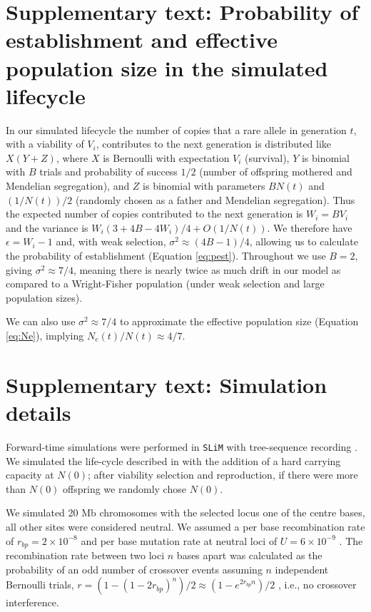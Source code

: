 \documentclass[]{article}
\begin{document}
\section*{Supplementary text: Probability of establishment and effective population size in the simulated lifecycle}
\label{sec:pestNe}

In our simulated lifecycle the number of copies that a rare allele in generation $t$, with a viability of $V_i$, contributes to the next generation is distributed like $X(Y + Z)$, where $X$ is Bernoulli with expectation $V_i$ (survival), $Y$ is binomial with $B$ trials and probability of success $1/2$ (number of offspring mothered and Mendelian segregation), and $Z$ is binomial with parameters $B N(t)$ and $(1/N(t))/2$ (randomly chosen as a father and Mendelian segregation).
Thus the expected number of copies contributed to the next generation is $W_i = B V_i$ and the variance is $W_i(3+4B-4W_i)/4 + O(1/N(t))$.
We therefore have $\epsilon = W_i - 1$ and, with weak selection, $\sigma^2 \approx (4B-1)/4$, allowing us to calculate the probability of establishment (Equation \ref{eq:pest}).
Throughout we use $B=2$, giving $\sigma^2 \approx 7/4$, meaning there is nearly twice as much drift in our model as compared to a Wright-Fisher population (under weak selection and large population sizes).

We can also use $\sigma^2 \approx 7/4$ to approximate the effective population size (Equation \ref{eq:Ne}), implying $N_e(t)/N(t) \approx 4/ 7$.

\section*{Supplementary text: Simulation details}
\label{sec:simdetails}

Forward-time simulations were performed in \texttt{SLiM} \citep[version 3.3;][]{Haller2019slim} with tree-sequence recording \citep{Haller2019tree}.
We simulated the life-cycle described in  with the addition of a hard carrying capacity at $N(0)$; after viability selection and reproduction, if there were more than $N(0)$ offspring we randomly chose $N(0)$.

We simulated 20 Mb chromosomes with the selected locus one of the centre bases, all other sites were considered neutral.
We assumed a per base recombination rate of $r_{bp}=2\times10^{-8}$ \citep[i.e., 2 cM/Mb; e.g.,][]{mackay2012drosophila} and per base mutation rate at neutral loci of $U=6\times10^{-9}$ \citep[e.g.,][]{haag2007direct}.
The recombination rate between two loci $n$ bases apart was calculated as the probability of an odd number of crossover events assuming $n$ independent Bernoulli trials, $r = (1-(1-2r_{bp})^n)/2 \approx (1-e^{2 r_{bp} n})/2$ \citep[equation 3 in][]{haldane1919combination}, i.e., no crossover interference.
\end{document}
